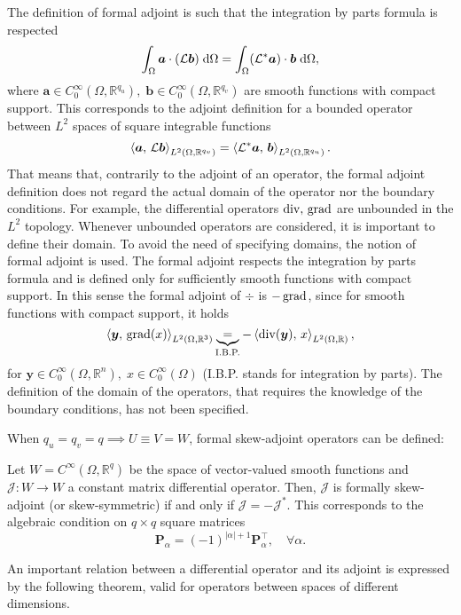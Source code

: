 \begin{remark}
The definition of formal adjoint is such that the integration by parts formula is respected
\begin{equation*}
\int_{\Omega} \bm{a} \cdot (\mathcal{L}\bm{b}) \d\Omega = \int_{\Omega} (\mathcal{L}^*\bm{a}) \cdot \bm{b} \d\Omega,
\end{equation*}
where $\bm{a} \in C^{\infty}_0(\Omega, \mathbb{R}^{q_u}), \; \bm{b} \in C^{\infty}_0(\Omega, \mathbb{R}^{q_v})$ are smooth functions with compact support. This corresponds to the adjoint definition for a bounded operator between $L^2$ spaces of square integrable functions
\begin{equation*}
\inner[L^2(\Omega, \mathbb{R}^{q_v})]{\bm{a}}{\mathcal{L}\bm{b}} = \inner[L^2(\Omega, \mathbb{R}^{q_u})]{\mathcal{L}^*\bm{a}}{\bm{b}}.
\end{equation*}
That means that, contrarily to the adjoint of an operator, the formal adjoint definition does not regard the actual domain of the operator nor the boundary conditions. For example, the differential operators $\div,\, \grad$ are unbounded in the ${L}^2$ topology. Whenever unbounded operators are considered, it is important to define their domain. To avoid the need of specifying domains, the notion of formal adjoint is used. The formal adjoint respects the integration by parts formula and is defined only for sufficiently smooth functions with compact support. In this sense the formal adjoint of $\div$  is $-\grad$, since for smooth functions with compact support, it holds
\begin{equation*}
\left\langle \bm{y}, \, \grad({x}) \right\rangle_{{L}^2(\Omega, \mathbb{R}^{3})} 
\underbrace{=}_{\text{I.B.P.}} -\left\langle\div(\bm{y}), \, {x} \right\rangle_{{L}^2(\Omega, \mathbb{R})},
\end{equation*}
for $\bm{y} \in C_0^\infty(\Omega, \mathbb{R}^{n}), \; {x} \in C_0^\infty(\Omega)$ (I.B.P. stands for integration by parts). The definition of the domain of the operators, that requires the knowledge of the boundary conditions, has not been specified. 
\end{remark}

When $q_u=q_v=q \implies U \equiv V = W$, formal skew-adjoint operators can be defined: 
\begin{definition}
	\label{def:skewOp}
	Let $W = C^{\infty}(\Omega, \mathbb{R}^{q})$ be the space of vector-valued smooth functions and $\mathcal{J}: W \rightarrow W$ a constant matrix differential operator. Then, $\mathcal{J}$ is formally skew-adjoint (or skew-symmetric) if and only if $\mathcal{J} = -\mathcal{J}^*$. This corresponds to the algebraic condition on $q \times q$ square matrices
	\begin{equation}
	\bm{P}_{\alpha} = (-1)^{|\alpha| + 1} \bm{P}_{\alpha}^\top, \quad \forall \alpha.
	\end{equation}
\end{definition}
An important relation between a differential operator and its adjoint is expressed by the following theorem, valid for operators between spaces of different dimensions.

